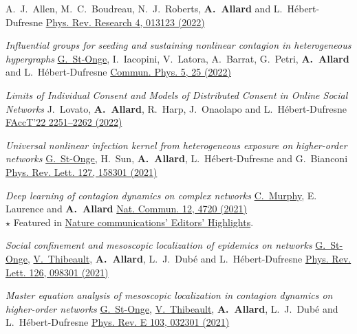 \documentclass[11pt]{article}
\makeatletter
\newcommand{\reversearabic}[1]{\expandafter\@reversearabic\csname c@#1\endcsname}
\newcommand{\@reversearabic}[1]{%
  \number\numexpr\getrefnumber{this@etaremune@\romannumeral\c@etaremune}-#1+1\relax
}
\newcounter{etaremune}
\newenvironment{etaremune}[1][]{%
  \stepcounter{etaremune}%
  \begin{enumerate}[label=\reversearabic*.,#1]%
}{%
  \edef\@currentlabel{\the\csname c@\@enumctr\endcsname}%
  \label{this@etaremune@\romannumeral\c@etaremune}%
  \end{enumerate}%
}
\makeatother
\begin{document}
\begin{etaremune}[itemsep=0.5em, label={[A\reversearabic*]}]
{  A.~J.~Allen, M.~C.~Boudreau, N.~J.~Roberts, \textbf{A.~Allard} and L.~H\'ebert-Dufresne\split
  \href{https://doi.org/10.1103/PhysRevResearch.4.013123}{Phys. Rev. Research 4, 013123 (2022)}}
%
  \item \parbox[t]{\textwidth-30pt}{\textit{Influential groups for seeding and sustaining nonlinear contagion in heterogeneous hypergraphs}\split
  \uline{G.~St-Onge}, I.~Iacopini, V.~Latora, A.~Barrat, G.~Petri, \textbf{A.~Allard} and L.~H\'ebert-Dufresne\split
  \href{https://doi.org/10.1038/s42005-021-00788-w}{Commun. Phys. 5, 25 (2022)}}
%
  \item \parbox[t]{\textwidth-30pt}{\textit{Limits of Individual Consent and Models of Distributed Consent in Online Social Networks}\split
  J.~Lovato, \textbf{A.~Allard}, R.~Harp, J.~Onaolapo and L.~H\'ebert-Dufresne\split
  \href{https://doi.org/10.1145/3531146.3534640}{FAccT'22 2251--2262 (2022)}}
%
  \item \parbox[t]{\textwidth-30pt}{\textit{Universal nonlinear infection kernel from heterogeneous exposure on higher-order networks}\split
  \uline{G.~St-Onge}, H.~Sun, \textbf{A.~Allard}, L.~H\'ebert-Dufresne and G.~Bianconi\split
  \href{https://doi.org/10.1103/PhysRevLett.127.158301}{Phys. Rev. Lett. 127, 158301 (2021)}}
%
  \item \parbox[t]{\textwidth-30pt}{\textit{Deep learning of contagion dynamics on complex networks}\split
  \uline{C.~Murphy}, E. Laurence and \textbf{A.~Allard}\split
  \href{https://doi.org/10.1038/s41467-021-24732-2}{Nat. Commun. 12, 4720 (2021)}\\
  {\footnotesize $\star$ Featured in \href{https://www.nature.com/ncomms/editorshighlights}{Nature communications' Editors' Highlights}.}}
%
  \item \parbox[t]{\textwidth-30pt}{\textit{Social confinement and mesoscopic localization of epidemics on networks}\split
  \uline{G.~St-Onge}, \uline{V.~Thibeault}, \textbf{A.~Allard}, L.~J.~Dub\'e and L.~H\'ebert-Dufresne\split
  \href{http://doi.org/10.1103/PhysRevLett.126.098301}{Phys. Rev. Lett. 126, 098301 (2021)}}
%
  \item \parbox[t]{\textwidth-30pt}{\textit{Master equation analysis of mesoscopic localization in contagion dynamics on higher-order networks}\split
  \uline{G.~St-Onge}, \uline{V.~Thibeault}, \textbf{A.~Allard}, L.~J.~Dub\'e and L.~H\'ebert-Dufresne\split
  \href{http://doi.org/10.1103/PhysRevE.103.032301}{Phys. Rev. E 103, 032301 (2021)}}

\end{etaremune}
\end{document}
